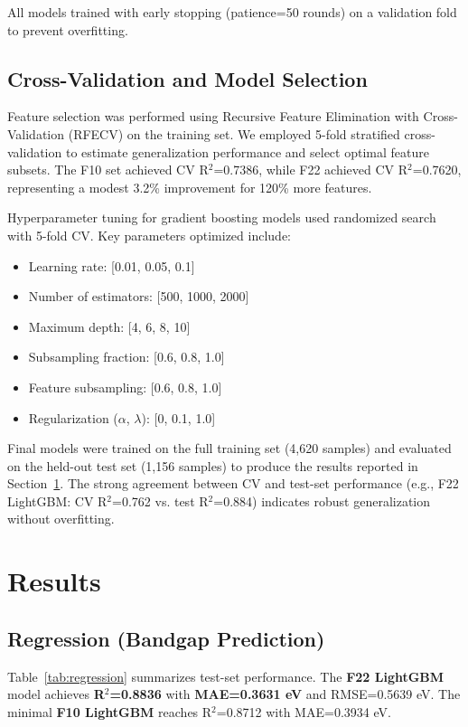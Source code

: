 \documentclass[conference]{IEEEtran}
\begin{document}
All models trained with early stopping (patience=50 rounds) on a validation fold to prevent overfitting.

\subsection{Cross-Validation and Model Selection}
Feature selection was performed using Recursive Feature Elimination with Cross-Validation (RFECV) on the training set. We employed 5-fold stratified cross-validation to estimate generalization performance and select optimal feature subsets. The F10 set achieved CV R$^2$=0.7386, while F22 achieved CV R$^2$=0.7620, representing a modest 3.2\% improvement for 120\% more features.

Hyperparameter tuning for gradient boosting models used randomized search with 5-fold CV. Key parameters optimized include:
\begin{itemize}
  \item Learning rate: [0.01, 0.05, 0.1]
  \item Number of estimators: [500, 1000, 2000]
  \item Maximum depth: [4, 6, 8, 10]
  \item Subsampling fraction: [0.6, 0.8, 1.0]
  \item Feature subsampling: [0.6, 0.8, 1.0]
  \item Regularization ($\alpha$, $\lambda$): [0, 0.1, 1.0]
\end{itemize}

Final models were trained on the full training set (4,620 samples) and evaluated on the held-out test set (1,156 samples) to produce the results reported in Section~\ref{sec:results}. The strong agreement between CV and test-set performance (e.g., F22 LightGBM: CV R$^2$=0.762 vs. test R$^2$=0.884) indicates robust generalization without overfitting.

\section{Results}\label{sec:results}
\subsection{Regression (Bandgap Prediction)}
Table~\ref{tab:regression} summarizes test-set performance. The \textbf{F22 LightGBM} model achieves \textbf{R$^2$=0.8836} with \textbf{MAE=0.3631 eV} and RMSE=0.5639 eV. The minimal \textbf{F10 LightGBM} reaches R$^2$=0.8712 with MAE=0.3934 eV.
\end{document}
